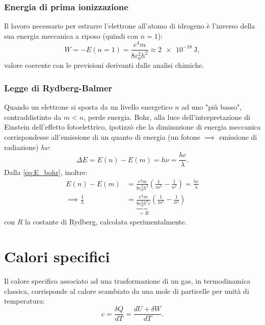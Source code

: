 \documentclass[a4paper,11pt]{report}
\begin{document}
\subsubsection{Energia di prima ionizzazione}
Il lavoro necessario per estrarre l'elettrone all'atomo di idrogeno è l'inverso della sua energia meccanica a riposo (quindi con $n = 1$):
\begin{equation}
W = -E(n = 1) = \frac{e^4 m}{8\varepsilon_0^2 h^2} \approx \SI{2e-18}{\joule},
\end{equation}
valore coerente con le previsioni derivanti dalle analisi chimiche.

\subsubsection{Legge di Rydberg-Balmer}
Quando un elettrone si sposta da un livello energetico $n$ ad uno "più basso", contraddistinto da $m < n$, perde energia. Bohr, alla luce dell'interpretazione di Einstein dell'effetto fotoelettrico, ipotizzò che la diminuzione di energia meccanica corrispondesse all'emissione di un quanto di energia (un fotone $\implies$ emissione di radiazione) $h\nu$:
\begin{equation}
\Delta E = E(n) - E(m) = h\nu = \frac{hc}{\lambda}.
\end{equation}
Dalla \eqref{eq:E_bohr}, inoltre:
\begin{equation}
\begin{aligned}
E(n) - E(m) &= \frac{e^4 m}{8\varepsilon_0^2 h^2}\left(\frac{1}{m^2}-\frac{1}{n^2} \right) = \frac{hc}{\lambda} \\
\implies \frac{1}{\lambda} &= \underbrace{\frac{e^4 m}{8\varepsilon_0^2 h^3c}}_{=R}\left(\frac{1}{m^2}-\frac{1}{n^2} \right)
\end{aligned}
\end{equation}
con $R$ la costante di Rydberg, calcolata sperimentalmente.

\section{Calori specifici}
Il calore specifico associato ad una trasformazione di un gas, in termodinamica classica, corrisponde al calore scambiato da una mole di particelle per unità di temperatura: 
\begin{equation}
c = \frac{\delta Q}{dT} = \frac{dU + \delta W}{dT}.
\end{equation}
\end{document}
